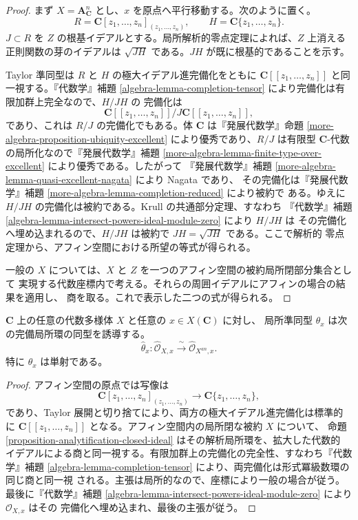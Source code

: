 \begin{proof}
まず $X=\mathbf A^n_{\mathbf C}$ とし、$x$ を原点へ平行移動する。次のように置く。
$$
R=\mathbf C[z_1,\ldots,z_n]_{(z_1,\ldots,z_n)},
\qquad
H=\mathbf C\{z_1,\ldots,z_n\}.
$$
$J \subset R$ を $Z$ の根基イデアルとする。局所解析的零点定理によれば、$Z$ 上消える
正則関数の芽のイデアルは $\sqrt{JH}$ である。$JH$ が既に根基的であることを示す。

Taylor 準同型は $R$ と $H$ の極大イデアル進完備化をともに
$\mathbf C[[z_1,\ldots,z_n]]$ と同一視する。『代数学』補題
\ref{algebra-lemma-completion-tensor} により完備化は有限加群上完全なので、$H/JH$ の
完備化は
$$
\mathbf C[[z_1,\ldots,z_n]]/
J\mathbf C[[z_1,\ldots,z_n]],
$$
であり、これは $R/J$ の完備化でもある。体 $\mathbf C$ は『発展代数学』命題
\ref{more-algebra-proposition-ubiquity-excellent} により優秀であり、$R/J$ は有限型
$\mathbf C$-代数の局所化なので『発展代数学』補題
\ref{more-algebra-lemma-finite-type-over-excellent} により優秀である。したがって
『発展代数学』補題 \ref{more-algebra-lemma-quasi-excellent-nagata} により Nagata であり、
その完備化は『発展代数学』補題 \ref{more-algebra-lemma-completion-reduced} により被約で
ある。ゆえに $H/JH$ の完備化は被約である。Krull の共通部分定理、すなわち
『代数学』補題 \ref{algebra-lemma-intersect-powers-ideal-module-zero} により $H/JH$ は
その完備化へ埋め込まれるので、$H/JH$ は被約で $JH=\sqrt{JH}$ である。ここで解析的
零点定理から、アフィン空間における所望の等式が得られる。

一般の $X$ については、$X$ と $Z$ を一つのアフィン空間の被約局所閉部分集合として
実現する代数座標内で考える。それらの周囲イデアルにアフィンの場合の結果を適用し、
商を取る。これで表示した二つの式が得られる。
\end{proof}

\begin{theorem}
\label{theorem-analytification-completed-local-rings}
$\mathbf C$ 上の任意の代数多様体 $X$ と任意の $x \in X(\mathbf C)$ に対し、
局所準同型 $\theta_x$ は次の完備局所環の同型を誘導する。
$$
\widehat{\theta}_x :
\widehat{\mathcal O}_{X,x} \xrightarrow{\ \sim\ }
\widehat{\mathcal O}_{X^{an},x}.
$$
特に $\theta_x$ は単射である。
\end{theorem}

\begin{proof}
アフィン空間の原点では写像は
$$
\mathbf C[z_1,\ldots,z_n]_{(z_1,\ldots,z_n)}
\longrightarrow \mathbf C\{z_1,\ldots,z_n\},
$$
であり、Taylor 展開と切り捨てにより、両方の極大イデアル進完備化は標準的に
$\mathbf C[[z_1,\ldots,z_n]]$ となる。アフィン空間内の局所閉な被約 $X$ について、
命題 \ref{proposition-analytification-closed-ideal} はその解析局所環を、拡大した代数的
イデアルによる商と同一視する。有限加群上の完備化の完全性、すなわち『代数学』補題
\ref{algebra-lemma-completion-tensor} により、両完備化は形式冪級数環の同じ商と同一視
される。主張は局所的なので、座標により一般の場合が従う。最後に『代数学』補題
\ref{algebra-lemma-intersect-powers-ideal-module-zero} により $\mathcal O_{X,x}$ はその
完備化へ埋め込まれ、最後の主張が従う。
\end{proof}

